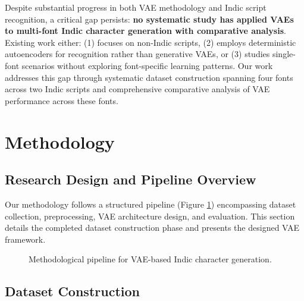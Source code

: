 \documentclass[review]{elsarticle}
\begin{document}
Despite substantial progress in both VAE methodology and Indic script recognition, a critical gap persists: \textbf{no systematic study has applied VAEs to multi-font Indic character generation with comparative analysis}. Existing work either: (1) focuses on non-Indic scripts, (2) employs deterministic autoencoders for recognition rather than generative VAEs, or (3) studies single-font scenarios without exploring font-specific learning patterns. Our work addresses this gap through systematic dataset construction spanning four fonts across two Indic scripts and comprehensive comparative analysis of VAE performance across these fonts.

\section{Methodology}
\label{sec:methodology}

\subsection{Research Design and Pipeline Overview}

Our methodology follows a structured pipeline (Figure \ref{fig:pipeline}) encompassing dataset collection, preprocessing, VAE architecture design, and evaluation. This section details the completed dataset construction phase and presents the designed VAE framework.

\begin{figure}[htbp]
\centering
{}
\caption{Methodological pipeline for VAE-based Indic character generation.}
\label{fig:pipeline}
\end{figure}

\subsection{Dataset Construction}
\label{subsec:dataset}
\end{document}
